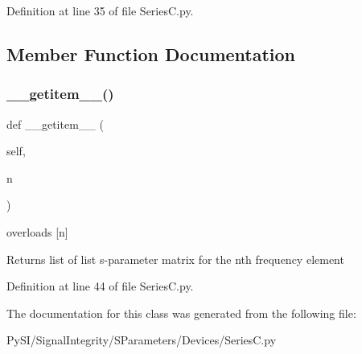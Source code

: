 Definition at line 35 of file Series\+C.\+py.



\subsection{Member Function Documentation}
\mbox{\label{classSignalIntegrity_1_1SParameters_1_1Devices_1_1SeriesC_1_1SeriesC_ab7a6da5139e0878b590d68292aaa70f2}} 
\subsubsection{\texorpdfstring{\+\_\+\+\_\+getitem\+\_\+\+\_\+()}{\_\_getitem\_\_()}}
{\footnotesize\ttfamily def \+\_\+\+\_\+getitem\+\_\+\+\_\+ (\begin{DoxyParamCaption}\item[{}]{self,  }\item[{}]{n }\end{DoxyParamCaption})}



overloads \mbox{[}n\mbox{]} 

\begin{DoxyReturn}{Returns}
list of list s-\/parameter matrix for the nth frequency element 
\end{DoxyReturn}


Definition at line 44 of file Series\+C.\+py.



The documentation for this class was generated from the following file\+:\begin{DoxyCompactItemize}
\item 
Py\+S\+I/\+Signal\+Integrity/\+S\+Parameters/\+Devices/Series\+C.\+py\end{DoxyCompactItemize}
